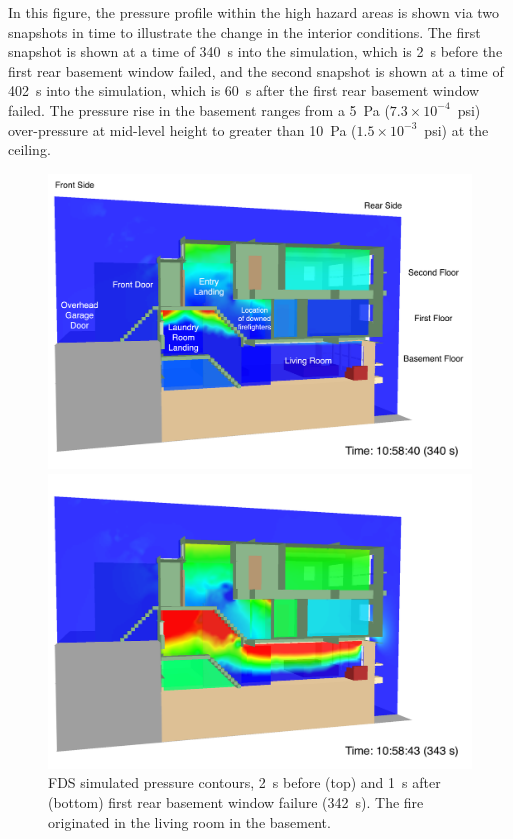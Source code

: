 \documentclass[12pt,oneside]{book}
\begin{document}
In this figure, the pressure profile within the high hazard areas is shown via two snapshots in time to illustrate the change in the interior conditions. The first snapshot is shown at a time of 340~s into the simulation, which is 2~s before the first rear basement window failed, and the second snapshot is shown at a time of 402~s into the simulation, which is 60~s after the first rear basement window failed. The pressure rise in the basement ranges from a 5~Pa ($7.3 \times 10^{-4}$~psi) over-pressure at mid-level height to greater than 10~Pa ($1.5 \times 10^{-3}$~psi) at the ceiling.

\begin{figure}[!ht]
\includegraphics[width=5.5in]{../Figures/SMV_Pres_340_s}

\includegraphics[width=5.5in]{../Figures/SMV_Pres_343_s}

\caption{FDS simulated pressure contours, 2~s before (top) and 1~s after (bottom) first rear basement window failure (342~s). The fire originated in the living room in the basement.}
\label{fig:smv_pressure}
\end{figure}
\end{document}

